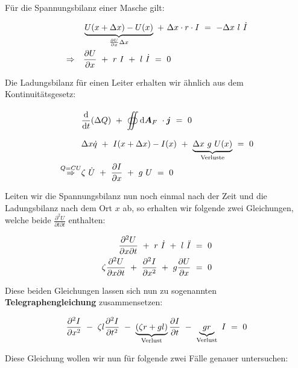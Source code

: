 Für die Spannungsbilanz einer Masche gilt:

\begin{align*}
& \underbrace{U(x+\Delta x) - U(x)}_{\pdiff{U}{x}\Delta x} \ + \ \Delta x \cdot r  \cdot I  \ = \ - \Delta x \ l \ \dot{I}\\
\Rightarrow\quad &\pdiff{U}{x} \ + \ r \ I \ + \ l \ \dot{I}  \ = \ 0
\end{align*}

Die Ladungsbilanz für einen Leiter erhalten wir ähnlich aus dem Kontinuitätsgesetz:

\begin{align*}
& \diff{}{t}(\Delta Q) \ + \ \Oiint{}{}{\vec{A}_F}\cdot\vec{j} \ = \ 0\\
& \Delta x \dot{q} \ + \ I(x+\Delta x)-I(x) \ + \ \underbrace{\Delta x \ g \ U(x)}_{\text{Verluste}} \ = \ 0\\
\overset{Q=CU}{\Rightarrow} & \zeta \ \dot{U} \ + \ \pdiff{I}{x} \ + \ g \ U  \ = \ 0
\end{align*}


Leiten wir die Spannungsbilanz nun noch einmal nach der Zeit und die  Ladungsbilanz nach dem Ort $x$ ab, so erhalten wir folgende zwei Gleichungen, welche beide $\frac{\partial^2 U}{\partial t \partial t}$ enthalten:

\begin{align*}
\frac{\partial^2 U}{\partial x \partial t} \ + \ r \ \dot{I} \ + \ l \ \ddot{I}  \ &= \ 0\\
\zeta\frac{\partial^2 U}{\partial x \partial t} \ + \ \pddiff{I}{x} \ + \ g \pdiff{U}{x}  \ &= \ 0
\end{align*}

Diese beiden Gleichungen lassen sich nun zu sogenannten \textbf{Telegraphengleichung} zusammensetzen:

\begin{equation*}
\frac{\partial ^2{I}}{\partial{x}^2} \ - \ \zeta l \frac{\partial ^2{I}}{\partial{t}^2} \ - \ \underbrace{\left(\zeta r + g l \right)}_{\text{Verlust}}\frac{\partial{I}}{\partial{t}} \ - \ \underbrace{g r}_{\text{Verlust}} \ I \ = \ 0
\end{equation*}


Diese Gleichung wollen wir nun für folgende zwei Fälle genauer untersuchen:

